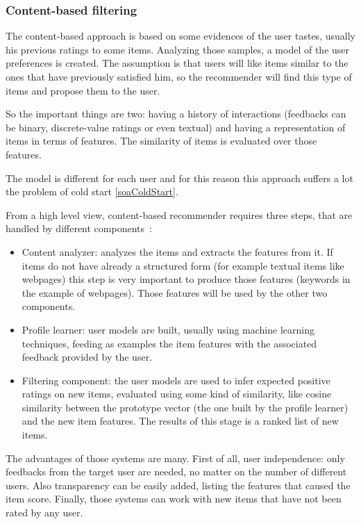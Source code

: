 \subsubsection{Content-based filtering}
The content-based approach is based on some evidences of the user tastes, usually his previous ratings to some items. Analyzing those samples, a model of the user preferences is created. The assumption is that users will like items similar to the ones that have previously satisfied him, so the recommender will find this type of items and propose them to the user.

So the important things are two: having a history of interactions (feedbacks can be binary, discrete-value ratings or even textual) and having a representation of items in terms of features. The similarity of items is evaluated over those features.

The model is different for each user and for this reason this approach suffers a lot the problem of cold start \ref{soaColdStart}.

From a high level view, content-based recommender requires three steps, that are handled by different components~\cite{lops2011content}:

\begin{itemize}
	\item Content analyzer: analyzes the items and extracts the features from it. If items do not have already a structured form (for example textual items like webpages) this step is very important to produce those features (keywords in the example of webpages). Those features will be used by the other two components.

	\item Profile learner: user models are built, usually using machine learning techniques, feeding as examples the item features with the associated feedback provided by the user.

	\item Filtering component: the user models are used to infer expected positive ratings on new items, evaluated using some kind of similarity, like cosine similarity between the prototype vector (the one built by the profile learner) and the new item features. The results of this stage is a ranked list of new items.
\end{itemize}

The advantages of those systems are many. First of all, user independence: only feedbacks from the target user are needed, no matter on the number of different users. Also transparency can be easily added, listing the features that caused the item score. Finally, those systems can work with new items that have not been rated by any user.

